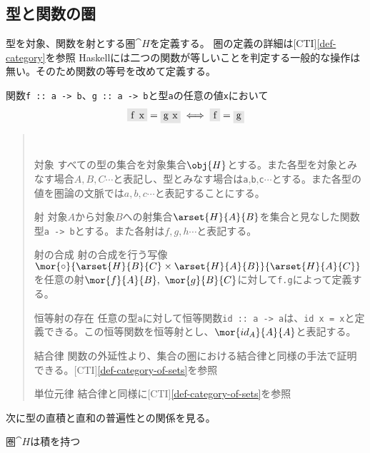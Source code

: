 \documentclass[uplatex,dvipdfmx]{jsarticle}
\newcommand{\pr}[1]{\colorbox[rgb]{0.9,0.9,0.9}{\lstinline{#1}}}
\newcommand{\functype}[2]{\pr{#1 -> #2}}
\newcommand{\refcti}[1]{[CTI]\ref{#1}}
\newcommand{\fpmor}[3]{\pr{#1 :: #2 -> #3}}
\begin{document}
  \subsection{型と関数の圏}
  型を対象、関数を射とする圏$\cat{H}$を定義する。
  圏の定義の詳細は\refcti{def-category}を参照
  Haskellには二つの関数が等しいことを判定する一般的な操作は無い。そのため関数の等号を改めて定義する。
  \begin{define}[関数の外延性]\label{def-function-extensionality}
    関数\fpmor{f}{a}{b}、\fpmor{g}{a}{b}と型\pr{a}の任意の値\pr{x}において\[\pr{f x}=\pr{g x} \iff \pr{f} = \pr{g}\]
  \end{define}
  \begin{define}[型と関数の圏]\label{def-hask-category}
		\begin{quote}~
			\begin{mydescription}
        \item[対象] すべての型の集合を対象集合$\obj{H}$とする。また各型を対象とみなす場合$A,B,C\cdots$と表記し、型とみなす場合は\pr{a},\pr{b},\pr{c}$\cdots$とする。また各型の値を圏論の文脈では$a,b,c\cdots$と表記することにする。
        \item[射] 対象$A$から対象$B$への射集合$\arset{H}{A}{B}$を集合と見なした関数型\functype{a}{b}とする。また各射は$f,g,h\cdots$と表記する。
        \item[射の合成] 射の合成を行う写像$\mor{\circ}{\arset{H}{B}{C}\times\arset{H}{A}{B}}{\arset{H}{A}{C}}$を任意の射$\mor{f}{A}{B},\ \mor{g}{B}{C}$に対して\pr{f.g}によって定義する。
        \item[恒等射の存在] 任意の型\pr{a}に対して恒等関数\fpmor{id}{a}{a}は、\pr{id x = x}と定義できる。この恒等関数を恒等射とし、$\mor{id_A}{A}{A}$と表記する。
        \item[結合律] 関数の外延性より、集合の圏における結合律と同様の手法で証明できる。\refcti{def-category-of-sets}を参照
        \item[単位元律]結合律と同様に\refcti{def-category-of-sets}を参照
		  \end{mydescription}
		\end{quote}
	\end{define}
  次に型の直積と直和の普遍性との関係を見る。
  \begin{prop}[$\cat{H}$の積]\label{prop-h-has-product}
    圏$\cat{H}$は積を持つ
  \end{prop}
\end{document}
